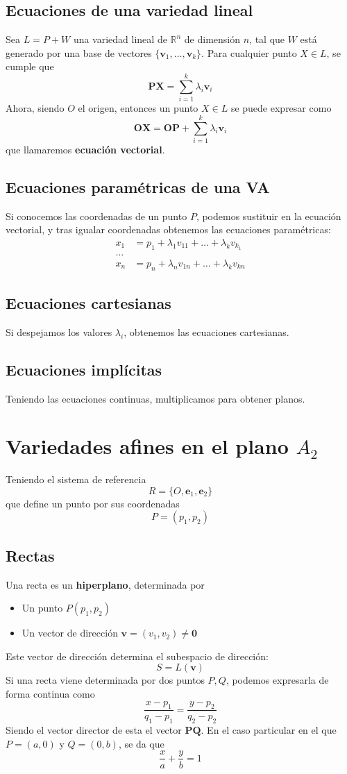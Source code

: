 \documentclass{./Geometria.tex}
\begin{document}
\subsection{Ecuaciones de una variedad lineal}
Sea $L=P+W$ una variedad lineal de $\mathbb{R}^{n}$ de dimensión $n$, tal que $W$ está generado por una base de vectores $\{ \mathbf{v}_{1},\dots ,\mathbf{v}_{k} \}$. Para cualquier punto $X \in L$, se cumple que
\[
	\mathbf{PX}= \sum_{i=1}^{k} \lambda_{i} \mathbf{v}_{i}
\]
Ahora, siendo $O$ el origen, entonces un punto $X \in L$ se puede expresar como
\[
	\mathbf{OX} = \mathbf{OP} + \sum_{i=1}^{k} \lambda_{i} \mathbf{v}_{i}
\]
que llamaremos \textbf{ecuación vectorial}.
\subsection{Ecuaciones paramétricas de una VA}
Si conocemos las coordenadas de un punto $P$, podemos sustituir en la ecuación vectorial, y tras igualar coordenadas obtenemos las ecuaciones paramétricas:
\begin{equation*}
	\begin{split}
		x_1 &= p_1 + \lambda_1v_{11}+\dots +\lambda_{k}v_{k_1}\\
		\dots \\
		x_{n} &= p_{n} + \lambda_{n}v_{1n} + \dots +\lambda_{k}v_{kn}
	\end{split}
\end{equation*}
\subsection{Ecuaciones cartesianas}
Si despejamos los valores $\lambda_{i}$, obtenemos las ecuaciones cartesianas.
\subsection{Ecuaciones implícitas}
Teniendo las ecuaciones continuas, multiplicamos para obtener planos.
\section{Variedades afines en el plano $A_{2}$ }
Teniendo el sistema de referencia
\[
	R = \{ O, \mathbf{e}_{1}, \mathbf{e}_{2} \}
\]
que define un punto por sus coordenadas
\[
	P=(p_1,p_2)
\]
\subsection{Rectas}
Una recta es un \textbf{hiperplano}, determinada por
\begin{itemize}
	\item Un punto $P(p_1,p_2)$
	\item Un vector de dirección $\mathbf{v}=(v_1,v_2) \neq \mathbf{0}$ 
\end{itemize}
Este vector de dirección determina el subespacio de dirección:
\[
	S=L(\mathbf{v})
\]
Si una recta viene determinada por dos puntos $P,Q$, podemos expresarla de forma continua como
\[
	\frac{x-p_1}{q_1-p_1}= \frac{y-p_2}{q_2-p_2}
\]
Siendo el vector director de esta el vector $\mathbf{PQ}$. En el caso particular en el que $P=(a, 0)$ y $Q=(0,b)$, se da que
\[
	\frac{x}{a}+\frac{y}{b}=1
\]
\end{document}
